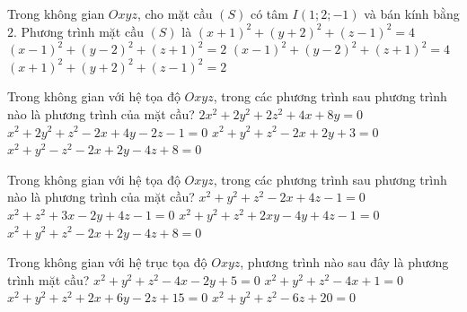

\begin{ex}%
	Trong không gian $Oxyz$, cho mặt cầu $(S)$ có tâm  $I(1;2;-1)$ và bán kính bằng $2$. Phương trình mặt cầu $(S)$ là
	 \choice
		{$(x+1)^2+(y+2)^2+(z-1)^2=4$} 
		 {$(x-1)^2+(y-2)^2+(z+1)^2=2$}
		{\True $(x-1)^2+(y-2)^2+(z+1)^2=4$} 
		{$(x+1)^2+(y+2)^2+(z-1)^2=2$} 
\end{ex}

\begin{ex}%
	Trong  không gian với hệ tọa độ $Oxyz$, trong các phương trình sau phương trình nào là phương trình của mặt cầu?
	 \choice
		 {\True $2x^2+2y^2+2z^2+4x+8y=0$}
		{$x^2+2y^2+z^2-2x+4y-2z-1=0$} 
		 {$x^2+y^2+z^2-2x+2y+3=0$}
		{$x^2+y^2-z^2-2x+2y-4z+8=0$} 
\end{ex}

\begin{ex}%
	Trong không gian với hệ tọa  độ $Oxyz$, trong các phương trình sau phương trình nào là phương trình của mặt cầu?
	\choice 
		{\True  $x^2+y^2+z^2-2x+4z-1=0$}
		{$x^2+z^2+3x-2y+4z-1=0$} 
		{$x^2+y^2+z^2+2xy-4y+4z-1=0$} 
		 {$x^2+y^2+z^2-2x+2y-4z+8=0$}
\end{ex}

\begin{ex}%
	 Trong không gian với hệ trục tọa độ $Oxyz$, phương trình nào sau đây là phương trình mặt cầu?
	 \choice
		{$x^2 + y^2 + z^2 - 4x - 2y + 5  = 0$}
		{\True $x^2 + y^2 + z^2  - 4x + 1 = 0$}
		{$x^2 + y^2 + z^2 + 2x + 6y  - 2z + 15 = 0$}
		{$x^2  + y^2 + z^2 - 6z + 20 = 0$}
\end{ex}


